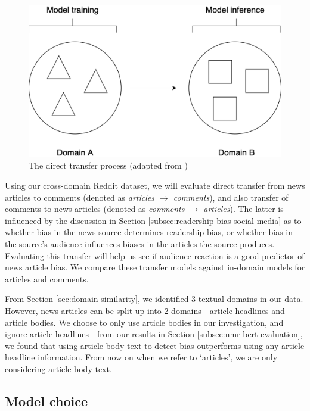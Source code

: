 \begin{figure}[ht]
    \centering
    \includegraphics[scale=0.25]{0-img/direct-transfer.png}
    \caption{The direct transfer process (adapted from \cite{ruder})}
    \label{fig:direct-transfer}
\end{figure}

Using our cross-domain Reddit dataset, we will evaluate direct transfer from news articles to comments (denoted as \textit{articles $ \rightarrow $ comments}), and also transfer of comments to news articles (denoted as \textit{comments $ \rightarrow $ articles}). The latter is influenced by the discussion in Section \ref{subsec:readership-bias-social-media} as to whether bias in the news source determines readership bias, or whether bias in the source's audience influences biases in the articles the source produces. Evaluating this transfer will help us see if audience reaction is a good predictor of news article bias. We compare these transfer models against in-domain models for articles and comments.

From Section \ref{sec:domain-similarity}, we identified 3 textual domains in our data. However, news articles can be split up into 2 domains - article headlines and article bodies. We choose to only use article bodies in our investigation, and ignore article headlines - from our results in Section \ref{subsec:nmr-bert-evaluation}, we found that using article body text to detect bias outperforms using any article headline information. From now on when we refer to `articles', we are only considering article body text.

\subsection{Model choice}

